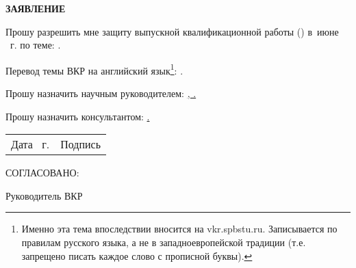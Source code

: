\vspace{0pt plus1fill} %


{\centering%
	
	\MakeUppercase{\bfseries{}Заявление} \\ 

	
	
\intervalS%
}\par%

\intervalS%

	Прошу разрешить мне защиту выпускной квалификационной работы (\thesisDegree) в~июне \thesisYear~г. по теме: {\expandafter \ulined \thesisTitle.}
	
\intervalS%
	
	Перевод темы ВКР на английский язык\footnote{Именно эта тема впоследствии вносится на vkr.spbstu.ru.
		Записывается по правилам русского языка, а не в западноевропейской традиции (т.е. запрещено писать каждое слово с прописной буквы).}:
	{\expandafter \ulined \thesisTitleEn.}
	
	
	

	
\intervalS%

Прошу назначить научным руководителем: \uline{\SupervisorJob, \SupervisorDegree{} \Supervisor.}

\intervalS%

Прошу назначить консультантом: \uline{\ConsultantExtraDegree{} \ConsultantExtra.}

\intervalS%


\noindent
\begin{minipage}{\linewidth}
	\vspace{\mfloatsep} %
	\begin{tabularx}{\linewidth}{Xl}

		\hspace*{-0.7em} Дата \uline{\thesisStartDate}~г. &Подпись \underline{\hspace*{0.1\textheight}} \\
		\end{tabularx}
	\vspace{\mfloatsep} %
\end{minipage}

\intervalS%

\noindent\MakeUppercase{Согласовано:}

\intervalS%

\noindent Руководитель ВКР \uline{\hspace*{0.1\textheight} \Supervisor}


